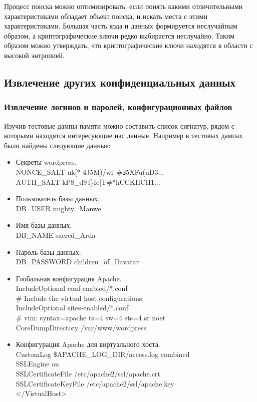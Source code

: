 \documentclass[20pt]{article}
\begin{document}
Процесс поиска можно оптимизировать, если понять какими отличительными
характеристиками обладает объект поиска, и искать места с этими характеристиками.
Большая часть кода и данных формируется неслучайным образом, а криптографические
ключи редко выбирается неслучайно. Таким образом можно утверждать, что
криптографические ключи находятся в области с высокой энтропией.

\subsection{Извлечение других конфиденциальных данных}

\subsubsection{Извлечение логинов и паролей, конфигурационных файлов}

Изучив тестовые дампы памяти можно составить список сигнатур, рядом с которыми
находятся интересующие нас данные. Например в тестовых дампах были найдены
следующие данные:

\begin{itemize}
  \item Секреты wordpress.\\
  NONCE\_SALT uk[* 4J5M)/wi~\#25XFu(uD3...\\
  AUTH\_SALT kP8\_d9\,f\}Ie|T\#*hCCKHCH1...
  \item Пользователь базы данных.\\
  DB\_USER mighty\_Manwe
  \item Имя базы данных.\\
  DB\_NAME sacred\_Arda
  \item Пароль базы данных.\\
  DB\_PASSWORD children\_of\_Iluvatar
  \item Глобальная конфигурация Apache.\\
  IncludeOptional conf-enabled/*.conf\\
  \# Include the virtual host configurations:\\
  IncludeOptional sites-enabled/*.conf\\
  \# vim: syntax=apache ts=4 sw=4 sts=4 sr noet\\
  CoreDumpDirectory /var/www/wordpress
  \item Конфигурация Apache для виртуального хоста.\\
  CustomLog \${APACHE\_LOG\_DIR}/access.log combined\\
  SSLEngine on\\
  SSLCertificateFile /etc/apache2/ssl/apache.crt\\
  SSLCertificateKeyFile /etc/apache2/ssl/apache.key\\
  </VirtualHost>
\end{itemize}
\end{document}
